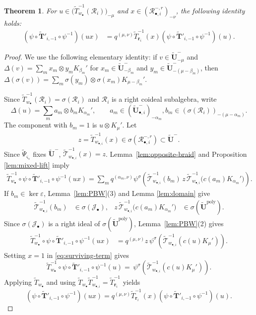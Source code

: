 \documentclass[a4paper,reqno,12pt]{amsart}
\numberwithin{equation}{section}
\newtheorem{theorem}[proposition]{Theorem}
\theoremstyle{definition}
\theoremstyle{plain}
\theoremstyle{definition}
\def\bw{w_\bullet}
\def\bwi{w_{\bullet,i}}
\def\br{\mathbf r}
\def\tU{\widetilde{\mathbf U}}
\def \tbiU{\tU_{\bullet,i}}
\def\tTD{\widetilde T}
\def\tT{\widetilde{\mathscr T}}
\def\tTT{\widetilde{\mathbf T}}
\def\tPsi{\widetilde\Psi}
\def\cR{\mathcal R}
\def\cJ{\mathcal J}
\def\bvs{\boldsymbol\varsigma}
\def\dm{\diamond}
\def \bvs{{\boldsymbol{\varsigma}}}
\newcommand{\tTa}[1]{\tTT'_{#1,-1}}
\newcommand{\eps}{\varepsilon}
\newcommand{\poly}{\mathrm{poly}}
\begin{document}
\begin{theorem}\label{thm:mixed}
For $u\in\bigl(\tTD_{\bw}^{-1}(\cR_i)\bigr)_{-\mu}$ and $x\in(\cR_{\bullet,i}^{-,r})_{-\nu}$, the following identity holds:
\begin{align}
(\psi\circ\tTa{i}\circ\psi^{-1})(ux)
&=q^{(\mu,\nu)}\tTD_{\br_i}^{-1}(x)
(\psi\circ\tTa{i}\circ\psi^{-1})(u).
\label{eq:main}
\end{align}
\end{theorem}

\begin{proof}
We use the following elementary identity: if $v\in\tU^-_{-\mu}$ and $\Delta(v)=\sum_mx_m\otimes y_mK_{\beta_m}'$ for $x_m\in\tU^-_{-\beta_{m}}$ and $y_m\in\tU^-_{-(\mu-\beta_{m})}$, then $\Delta(\sigma(v))=\sum_m\sigma(y_m)\otimes\sigma(x_m)K_{\mu-\beta_m}'$.

Since $\tTD_{\bw}^{-1}(\cR_i)=\sigma(\cR_i)$ and $\cR_i$ is a right coideal subalgebra, write
\begin{equation*}
    \Delta(u)=\sum_m a_m\otimes b_mK_{\alpha_m}',\qquad a_m\in(\tbiU^-)_{-\alpha_m},
b_m\in(\sigma(\cR_i))_{-(\mu-\alpha_m)}.
\end{equation*}
The component with $b_m=1$ is $u\otimes K_\mu'$.
Let
\begin{align*}
z=\tTD_{\bwi}^{-1}(x)\in\sigma(\cR_{\bullet,i}^{-,r})\subset\tU^-.
\end{align*}
Since $\tPsi_{\bvs_\dm}$ fixes $\tU^-$,
$\tT_{\bwi}^{-1}(x)=z$.
Lemma~\ref{lem:opposite-braid} and Proposition \ref{lem:mixed-lift} imply
\begin{align}
\tTD_{\bw}^{-1}\circ\psi\circ\tTa{i}\circ\psi^{-1}(ux)=\sum_m q^{(\alpha_m,\nu)}
\psi^\sigma\left(
\tT_{\bwi}^{-1}(b_m)\,z\,
\tT_{\bwi}^{-1}\bigl(c(a_m)K_{\alpha_m}'\bigr)\right).
\label{eq:projected-sum}
\end{align}
If $b_m\in\ker\eps$, Lemma~\ref{lem:PBW}(3) and Lemma \ref{lem:domain} give
\begin{align*}
\tT_{\bwi}^{-1}(b_m)&\in\sigma(\cJ_\bullet),
&z\,\tT_{\bwi}^{-1}\bigl(c(a_m)K_{\alpha_m}'\bigr)
&\in\sigma(\tU^\poly).
\end{align*}
Since $\sigma(\cJ_\bullet)$ is
a right ideal of $\sigma(\tU^\poly)$, Lemma~\ref{lem:PBW}(2) gives
\begin{align}
\tTD_{\bw}^{-1}\circ\psi\circ\tTa{i}\circ\psi^{-1}(ux)
&=q^{(\mu,\nu)}z\,
\psi^\sigma\left(\tT_{\bwi}^{-1}(c(u)K_\mu')\right).
\label{eq:surviving-term}
\end{align}
Setting $x=1$ in \eqref{eq:surviving-term} gives
\begin{equation*}
  \tTD_{\bw}^{-1}\circ\psi\circ\tTa{i}\circ\psi^{-1}(u)
=\,
\psi^\sigma\left(\tT_{\bwi}^{-1}(c(u)K_\mu')\right).  
\end{equation*}
Applying $\tTD_{\bw}$ and using $\tTD_{\bw}\tTD_{\bwi}^{-1}=\tTD_{\br_i}^{-1}$ yields
\begin{equation*}
    (\psi\circ\tTa{i}\circ\psi^{-1})(ux)=q^{(\mu,\nu)}\tTD_{\br_i}^{-1}(x)
(\psi\circ\tTa{i}\circ\psi^{-1})(u).
\end{equation*}
\end{proof}
\end{document}
